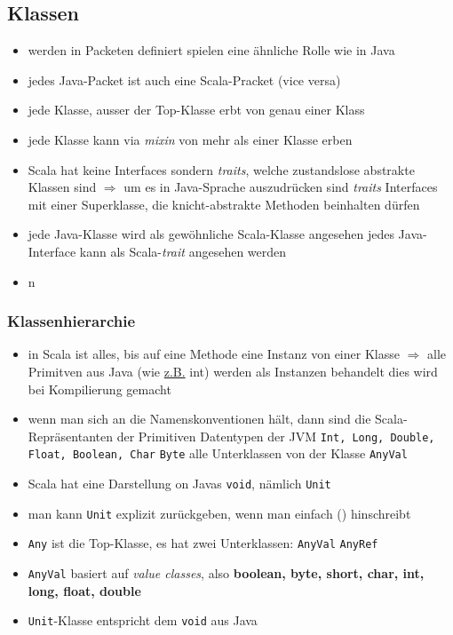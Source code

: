 \subsection{Klassen}
\begin{itemize}
  \item werden in Packeten definiert \und spielen eine ähnliche Rolle wie
  in Java
  \item jedes Java-Packet ist auch eine Scala-Pracket (vice versa)
  \item jede Klasse, ausser der Top-Klasse erbt von genau einer Klass
  \item jede Klasse kann via \textit{mixin} von mehr als einer Klasse
  erben
  \item Scala hat keine Interfaces sondern \textit{traits}, welche 
  zustandslose abstrakte Klassen sind $\Rightarrow$ um es in Java-Sprache
  auszudrücken sind \textit{traits} Interfaces mit einer Superklasse, die
  knicht-abstrakte Methoden beinhalten dürfen
  \item jede Java-Klasse wird als gewöhnliche Scala-Klasse angesehen \und 
  jedes Java-Interface kann als Scala-\textit{trait} angesehen werden
  \item n
\end{itemize}


\subsubsection{Klassenhierarchie}
\begin{itemize}
  \item in Scala ist alles, bis auf eine Methode eine Instanz von
  einer Klasse $\Rightarrow$ alle Primitven aus Java (wie \uline{z.B.} int) 
  werden als Instanzen behandelt \und dies wird bei Kompilierung gemacht
  \item wenn man sich an die Namenskonventionen hält, dann sind
  die Scala-Repräsentanten der Primitiven Datentypen der JVM 
  \texttt{Int, Long, Double, Float, Boolean, Char} \und 
  \texttt{Byte} alle Unterklassen von der Klasse \texttt{AnyVal}
  \item Scala hat eine Darstellung on Javas \texttt{void}, nämlich 
  \texttt{Unit}
  \item man kann \texttt{Unit} explizit zurückgeben, wenn man einfach
  () hinschreibt
  \item \texttt{Any} ist die Top-Klasse, es hat zwei Unterklassen:
  \texttt{AnyVal} \und \texttt{AnyRef}
  \item \texttt{AnyVal}  basiert auf \textit{value classes}, also
  \textbf{boolean, byte, short, char, int, long, float, double}
  \item \texttt{Unit}-Klasse entspricht dem \texttt{void} aus Java
\end{itemize}


